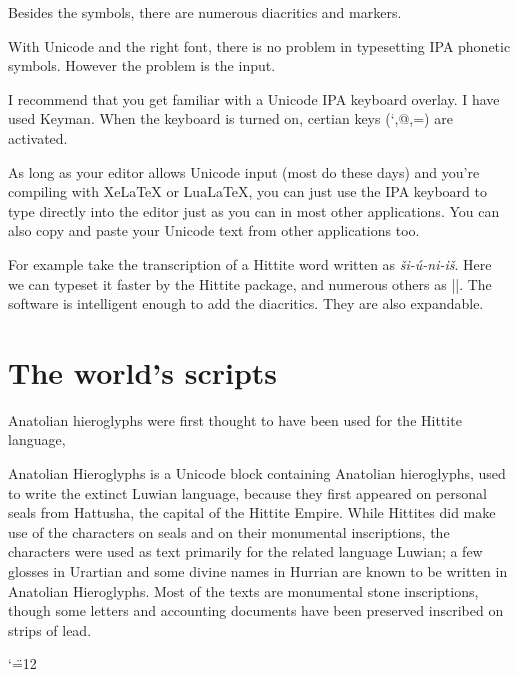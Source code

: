 \def\schwa{{\arial \char"0259}}

Besides the symbols, there are numerous diacritics and markers.

With Unicode and the right font, there is no problem  in typesetting IPA phonetic symbols. However the problem is the input.

I recommend that you get familiar with a Unicode IPA keyboard overlay. I have used Keyman. When the keyboard is turned on, certian keys (`,@,=) are activated.

As long as your editor allows Unicode input (most do these days) and you're compiling with XeLaTeX or LuaLaTeX, you can just use the IPA keyboard to type directly into the editor just as you can in most other applications. You can also copy and paste your Unicode text from other applications too. 

For example take the transcription of a Hittite word written as \emph{ši-ú-ni-iš}. Here we can typeset it faster by the Hittite package, and numerous others as ||. The software is intelligent enough to add the diacritics. They are also expandable. 

\section{The world's scripts}

Anatolian hieroglyphs were first thought to have been used for the Hittite language, 

Anatolian Hieroglyphs is a Unicode block containing Anatolian hieroglyphs, used to write the extinct Luwian language, because they first appeared on personal seals from Hattusha, the capital of the Hittite Empire. While
Hittites did make use of the characters on seals and on their monumental inscriptions, the characters were
used as text primarily for the related language Luwian; a few glosses in Urartian and some divine names
in Hurrian are known to be written in Anatolian Hieroglyphs. Most of the texts are monumental stone
inscriptions, though some letters and accounting documents have been preserved inscribed on strips of
lead. 

\newfontfamily{}
{
\catcode`\"=12
}
























